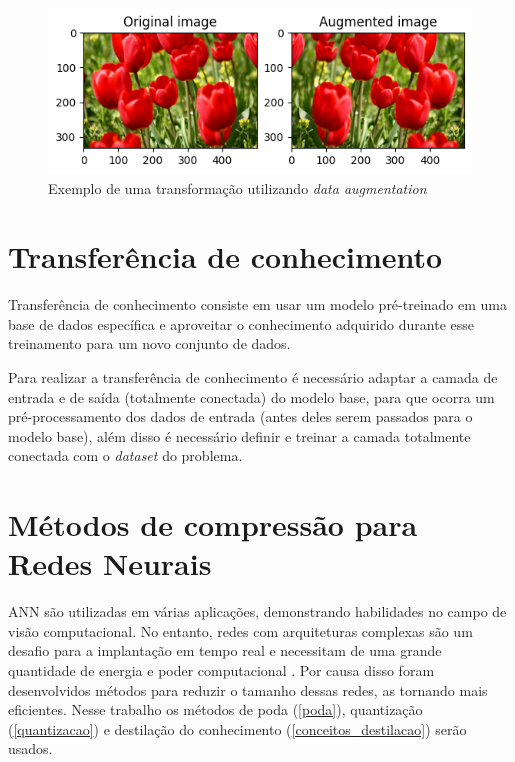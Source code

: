 \begin{figure}[htb]
	\begin{center}
		\includegraphics[scale=1]{Imagens/exemplo_da}
	\end{center}
	\caption {\label{cap_conceitos_exemplo_da}Exemplo de uma transformação utilizando \textit{data augmentation}}
\end{figure}

\section{Transferência de conhecimento}\label{cap_conceitos_transferencia}
Transferência de conhecimento consiste em usar um modelo pré-treinado em uma base de dados específica e aproveitar
o conhecimento adquirido durante esse treinamento para um novo conjunto de dados.

Para realizar a transferência de conhecimento é necessário adaptar a camada de entrada e de saída
(totalmente conectada) do modelo base, para que ocorra um pré-processamento dos dados de entrada
(antes deles serem passados para o modelo base), além disso é necessário definir e treinar a camada totalmente
conectada com o \textit{dataset} do problema.

\section{Métodos de compressão para Redes Neurais}\label{cap_conceitos_compressao_redes}
ANN são utilizadas em várias aplicações, demonstrando habilidades no campo de visão computacional.
No entanto, redes com arquiteturas complexas são um desafio para a implantação em tempo real e necessitam de uma
grande quantidade de energia e poder computacional \cite{LIANG2021370}.
Por causa disso foram desenvolvidos métodos para reduzir o tamanho dessas redes, as tornando mais eficientes.
Nesse trabalho os métodos de poda (\autoref{poda}), quantização (\autoref{quantizacao}) e destilação do conhecimento
(\autoref{conceitos_destilacao}) serão usados.


